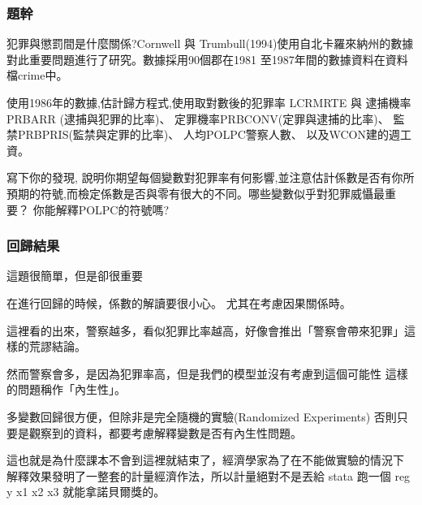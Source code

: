 \begin{frame}
    \frametitle{題幹}
    犯罪與懲罰間是什麼關係?Cornwell 與 Trumbull(1994)使用自北卡羅來納州的數據對此重要問題進行了研究。數據採用90個郡在1981 至1987年間的數據資料在資料檔crime中。

    使用1986年的數據,估計歸方程式,使用取對數後的犯罪率
     LCRMRTE 與
     逮捕機率 PRBARR (逮捕與犯罪的比率)、
     定罪機率PRBCONV(定罪與逮捕的比率)、
     監禁PRBPRIS(監禁與定罪的比率)、
     人均POLPC警察人數、
     以及WCON建的週工資。
     
     寫下你的發現,
    說明你期望每個變數對犯罪率有何影響,並注意估計係數是否有你所預期的符號,而檢定係數是否與零有很大的不同。哪些變數似乎對犯罪威懾最重要？
    你能解釋POLPC的符號嗎?
\end{frame}

\begin{frame}[fragile]
    \frametitle{回歸結果}
    \begin{table}
        \centering
        \scalebox{0.7}{
            
        }
    \end{table}

\end{frame}

\begin{frame}[plain]
    這題很簡單，但是卻很重要


在進行回歸的時候，係數的解讀要很小心。
尤其在考慮因果關係時。
\pause
\par
這裡看的出來，警察越多，看似犯罪比率越高，好像會推出「警察會帶來犯罪」這樣的荒謬結論。
\pause
\par
然而警察會多，是因為犯罪率高，但是我們的模型並沒有考慮到這個可能性
這樣的問題稱作「內生性」。
\pause
\par
多變數回歸很方便，但除非是完全隨機的實驗(Randomized Experiments)
否則只要是觀察到的資料，都要考慮解釋變數是否有內生性問題。
\pause
\par
這也就是為什麼課本不會到這裡就結束了，經濟學家為了在不能做實驗的情況下
解釋效果發明了一整套的計量經濟作法，所以計量絕對不是丟給 stata 跑一個
reg y x1 x2 x3
就能拿諾貝爾獎的。

    

\end{frame}